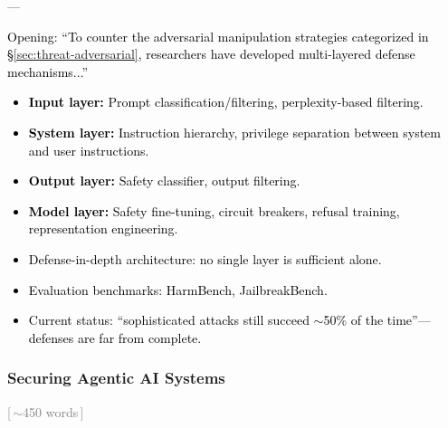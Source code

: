 ––\documentclass[preprint,12pt]{elsarticle}
\newcommand{\wordcount}[1]{\hfill\textcolor{gray}{\small[\,#1\,]}}
\newcommand{\outline}[1]{\textcolor{black}{#1}}
\begin{document}
\outline{%
Opening: ``To counter the adversarial manipulation strategies categorized in \S\ref{sec:threat-adversarial}, researchers have developed multi-layered defense mechanisms...''
\begin{itemize}[nosep,leftmargin=1.5em]
    \item \textbf{Input layer:} Prompt classification/filtering, perplexity-based filtering.
    \item \textbf{System layer:} Instruction hierarchy, privilege separation between system and user instructions.
    \item \textbf{Output layer:} Safety classifier, output filtering.
    \item \textbf{Model layer:} Safety fine-tuning, circuit breakers, refusal training, representation engineering.
    \item Defense-in-depth architecture: no single layer is sufficient alone.
    \item Evaluation benchmarks: HarmBench, JailbreakBench.
    \item Current status: ``sophisticated attacks still succeed $\sim$50\% of the time''---defenses are far from complete.
\end{itemize}
}

\subsubsection{Securing Agentic AI Systems} \wordcount{$\sim$450 words}
\end{document}
